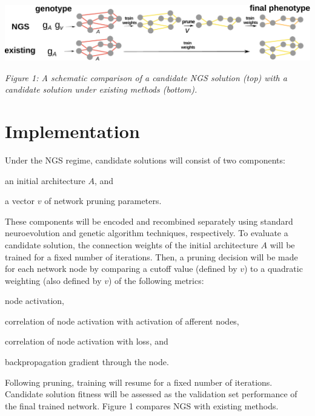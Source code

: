 \noindent
\begin{minipage}{0.8\textwidth}
 \includegraphics[width=\textwidth]{img/complete}
\end{minipage}%
\begin{minipage}{0.2\textwidth}
  {
  \begin{footnotesize}
    \textit{
   Figure 1: A schematic comparison of a candidate NGS solution (top) with a candidate solution under existing methods (bottom).
   }
  \end{footnotesize}
  \par}
\end{minipage}

\section{Implementation}

Under the NGS regime, candidate solutions will consist of two components:
\begin{enumerate*}[label=(\arabic*)]
\item an initial architecture $A$, and
\item a vector $v$ of network pruning parameters.
\end{enumerate*}
These components will be encoded and recombined separately using standard neuroevolution and genetic algorithm techniques, respectively.
To evaluate a candidate solution, the connection weights of the initial architecture $A$ will be trained for a fixed number of iterations.
Then, a pruning decision will be made for each network node by comparing a cutoff value (defined by $v$) to a quadratic weighting (also defined by $v$) of the following metrics:
\begin{enumerate*}[label=(\alph*)]
\item node activation,
\item correlation of node activation with activation of afferent nodes,
\item correlation of node activation with loss, and
\item backpropagation gradient through the node.
\end{enumerate*}
Following pruning, training will resume for a fixed number of iterations. Candidate solution fitness will be assessed as the validation set performance of the final trained network.
Figure 1 compares NGS with existing methods.

